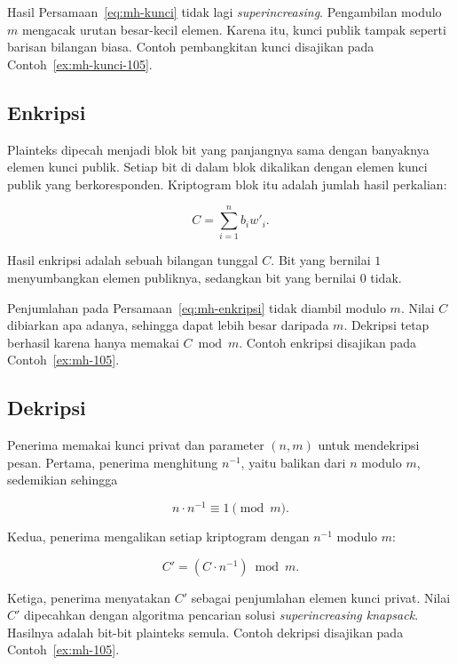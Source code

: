 Hasil Persamaan~\eqref{eq:mh-kunci} tidak lagi \textit{superincreasing}.
Pengambilan modulo $m$ mengacak urutan besar-kecil elemen. Karena itu, kunci
publik tampak seperti barisan bilangan biasa. Contoh pembangkitan kunci
disajikan pada Contoh~\ref{ex:mh-kunci-105}.

\subsection{Enkripsi}

Plainteks dipecah menjadi blok bit yang panjangnya sama dengan banyaknya elemen
kunci publik. Setiap bit di dalam blok dikalikan dengan elemen kunci publik yang
berkoresponden. Kriptogram blok itu adalah jumlah hasil perkalian:

\begin{equation}
C = \sum_{i=1}^{n} b_i w'_i .
\label{eq:mh-enkripsi}
\end{equation}

Hasil enkripsi adalah sebuah bilangan tunggal $C$. Bit yang bernilai $1$
menyumbangkan elemen publiknya, sedangkan bit yang bernilai $0$ tidak.

Penjumlahan pada Persamaan~\eqref{eq:mh-enkripsi} tidak diambil modulo $m$.
Nilai $C$ dibiarkan apa adanya, sehingga dapat lebih besar daripada $m$.
Dekripsi tetap berhasil karena hanya memakai $C \bmod m$. Contoh enkripsi
disajikan pada Contoh~\ref{ex:mh-105}.

\subsection{Dekripsi}

Penerima memakai kunci privat dan parameter $(n, m)$ untuk mendekripsi pesan.
Pertama, penerima menghitung $n^{-1}$, yaitu balikan dari $n$ modulo $m$,
sedemikian sehingga

\[ n \cdot n^{-1} \equiv 1 \pmod{m} . \]

Kedua, penerima mengalikan setiap kriptogram dengan $n^{-1}$ modulo $m$:

\begin{equation}
C' = (C \cdot n^{-1}) \bmod m .
\label{eq:mh-dekripsi}
\end{equation}

Ketiga, penerima menyatakan $C'$ sebagai penjumlahan elemen kunci privat. Nilai
$C'$ dipecahkan dengan algoritma pencarian solusi \textit{superincreasing
knapsack}. Hasilnya adalah bit-bit plainteks semula. Contoh dekripsi disajikan
pada Contoh~\ref{ex:mh-105}.

